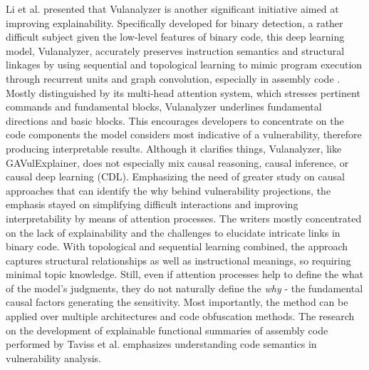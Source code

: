 \documentclass{buthesis}
\begin{document}
Li et al. \cite{li2023vulanalyzer} presented that Vulanalyzer is another significant initiative aimed at improving explainability. Specifically developed for binary detection, a rather difficult subject given the low-level features of binary code, this deep learning model, Vulanalyzer, accurately preserves instruction semantics and structural linkages by using sequential and topological learning to mimic program execution through recurrent units and graph convolution, especially in assembly code \cite{taviss2024asm2seq}. Mostly distinguished by its multi-head attention system, which stresses pertinent commands and fundamental blocks, Vulanalyzer underlines fundamental directions and basic blocks. This encourages developers to concentrate on the code components the model considers most indicative of a vulnerability, therefore producing interpretable results. Although it clarifies things, Vulanalyzer, like GAVulExplainer, does not especially mix causal reasoning, causal inference, or causal deep learning (CDL). Emphasizing the need of greater study on causal approaches that can identify the why behind vulnerability projections, the emphasis stayed on simplifying difficult interactions and improving interpretability by means of attention processes. The writers mostly concentrated on the lack of explainability and the challenges to elucidate intricate links in binary code. With topological and sequential learning combined, the approach captures structural relationships as well as instructional meanings, so requiring minimal topic knowledge. Still, even if attention processes help to define the what of the model's judgments, they do not naturally define the \emph{why} - the fundamental causal factors generating the sensitivity. Most importantly, the method can be applied over multiple architectures and code obfuscation methods. The research on the development of explainable functional summaries of assembly code performed by Taviss et al. \cite{taviss2024asm2seq} emphasizes understanding code semantics in vulnerability analysis.
\end{document}
